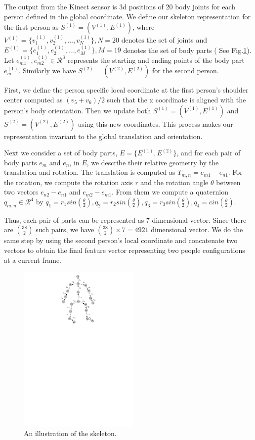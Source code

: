 \documentclass[10pt,twocolumn,letterpaper]{article}
\begin{document}
The output from the Kinect sensor is 3d positions of 20 body joints for each person defined in the global coordinate. We define our skeleton representation for the first person as $S^{(1)}=(V^{(1)},E^{(1)})$, where $V^{(1)}=\{v_{1}^{(1)},v_{2}^{(1)},\dots,v_{N}^{(1)}\}, N=20$ denotes the set of joints and $E^{(1)}=\{e_{1}^{(1)},e_{2}^{(1)},\dots,e_{M}^{(1)}\}, M=19$ denotes the set of body parts ( See Fig.\ref{fig:skeleton}). Let $e_{m1}^{(1)},e_{m2}^{(1)} \in \mathcal{R}^3$ represents the starting and ending points of the body part $e_{m}^{(1)}$. Similarly we have $S^{(2)}=(V^{(2)},E^{(2)})$ for the second person.

First, we define the person specific local coordinate at the first person's shoulder center computed as $(v_5 + v_6)/2$ such that the x coordinate is aligned with the person's body orientation. Then we update both $S^{(1)}=(V^{(1)},E^{(1)})$ and $S^{(2)}=(V^{(2)},E^{(2)})$ using this new coordinates. This process makes our representation invariant to the global translation and orientation. 

Next we consider a set of body parts, $E=\{E^{(1)},E^{(2)}\}$, and for each pair of body parts $e_m$ and $e_n$, in $E$, we describe their relative geometry by the translation and rotation. The translation is computed as $T_{m,n}=e_{m1}-e_{n1}$. For the rotation, we compute the rotation axis $r$ and the rotation angle $\theta$ between two vectors $e_{n2}-e_{n1}$ and $e_{m2}-e_{m1}$. From them we compute a quaternion $q_{m,n} \in \mathcal{R}^4$ by $q_1=r_1 sin( \frac{\theta}{2} ), q_2=r_2 sin( \frac{\theta}{2} ), q_3=r_3 sin( \frac{\theta}{2}), q_4=cin( \frac{\theta}{2})$.

Thus, each pair of parts can be represented as 7 dimensional vector. Since there are $\binom{38}{2}$ such pairs, we have $\binom{38}{2} \times 7 = 4921$ dimensional vector. We do the same step by using the second person's local coordinate and concatenate two vectors to obtain the final feature vector representing two people configurations at a current frame.

\begin{figure}[htb]
\begin{center}
\includegraphics[width=2.3in]{skeleton.pdf}
\caption{An illustration of the skeleton. \label{fig:skeleton}}
\end{center}
\end{figure}
\end{document}
